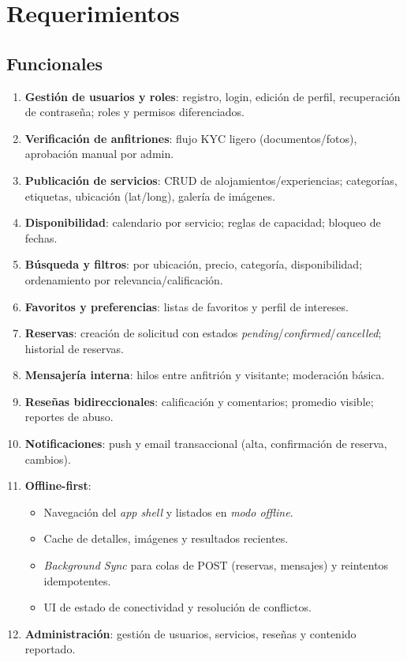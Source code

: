 \documentclass[12pt]{article}
\begin{document}
\section{Requerimientos}
\subsection{Funcionales}
\begin{enumerate}[label=\textbf{F-\arabic*}, left=0pt, itemsep=4pt]
  \item \textbf{Gestión de usuarios y roles}: registro, login, edición de perfil, recuperación de contraseña; roles y permisos diferenciados.
  \item \textbf{Verificación de anfitriones}: flujo KYC ligero (documentos/fotos), aprobación manual por admin.
  \item \textbf{Publicación de servicios}: CRUD de alojamientos/experiencias; categorías, etiquetas, ubicación (lat/long), galería de imágenes.
  \item \textbf{Disponibilidad}: calendario por servicio; reglas de capacidad; bloqueo de fechas.
  \item \textbf{Búsqueda y filtros}: por ubicación, precio, categoría, disponibilidad; ordenamiento por relevancia/calificación.
  \item \textbf{Favoritos y preferencias}: listas de favoritos y perfil de intereses.
  \item \textbf{Reservas}: creación de solicitud con estados \emph{pending}/\emph{confirmed}/\emph{cancelled}; historial de reservas.
  \item \textbf{Mensajería interna}: hilos entre anfitrión y visitante; moderación básica.
  \item \textbf{Reseñas bidireccionales}: calificación y comentarios; promedio visible; reportes de abuso.
  \item \textbf{Notificaciones}: push y email transaccional (alta, confirmación de reserva, cambios).
  \item \textbf{Offline-first}: 
    \begin{itemize}[nosep]
      \item Navegación del \textit{app shell} y listados en \emph{modo offline}.
      \item Cache de detalles, imágenes y resultados recientes.
      \item \textit{Background Sync} para colas de POST (reservas, mensajes) y reintentos idempotentes.
      \item UI de estado de conectividad y resolución de conflictos.
    \end{itemize}
  \item \textbf{Administración}: gestión de usuarios, servicios, reseñas y contenido reportado.
\end{enumerate}
\end{document}
